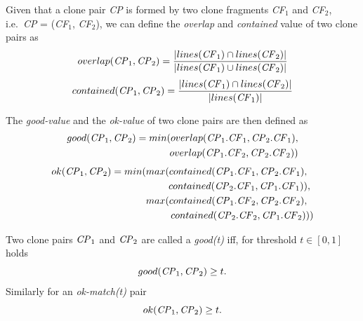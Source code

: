 \documentclass[sigconf,review, anonymous]{acmart}
\newcommand{\squeezeup}{\vspace{-0.5mm}}
\begin{document}
Given that a clone pair \textit{CP} is formed by two clone fragments
\textit{CF$_1$} and \textit{CF$_2$}, i.e.~\textit{CP} = (\textit{CF$_1$},
\textit{CF$_2$}), we can define the \textit{overlap} and
\textit{contained} value of two clone pairs as
\begin{displaymath}
  overlap(\textrm{\textit{CP}}_1, \textrm{\textit{CP}}_2) = \frac{|lines(\textrm{\textit{CF}}_1) \cap lines(\textrm{\textit{CF}}_2)|}{|lines(\textrm{\textit{CF}}_1) \cup lines(\textrm{\textit{CF}}_2)|} 
\end{displaymath}
\begin{displaymath}
  contained(\textrm{\textit{CP}}_1, \textrm{\textit{CP}}_2) = \frac{|lines(\textrm{\textit{CF}}_1) \cap lines(\textrm{\textit{CF}}_2)|}{|lines(\textrm{\textit{CF}}_1)|}
\end{displaymath}
      
\noindent%
The \textit{good-value}  and the \textit{ok-value}  of two clone pairs are then defined as
\begin{align*}
	good(\textrm{\textit{CP}}_1, \textrm{\textit{CP}}_2) = min(overlap(\textrm{\textit{CP}}_1.\textrm{\textit{CF}}_1,\textrm{\textit{CP}}_2.\textrm{\textit{CF}}_1), \\ overlap(\textrm{\textit{CP}}_1.\textrm{\textit{CF}}_2,\textrm{\textit{CP}}_2.\textrm{\textit{CF}}_2))
\end{align*}
\begin{align*}
	ok(\textrm{\textit{CP}}_1,\textrm{\textit{CP}}_2) = min(max(contained(\textrm{\textit{CP}}_1.\textrm{\textit{CF}}_1,\textrm{\textit{CP}}_2.\textrm{\textit{CF}}_1),~~ \\ contained(\textrm{\textit{CP}}_2.\textrm{\textit{CF}}_1,\textrm{\textit{CP}}_1.\textrm{\textit{CF}}_1)),~
	\\ max(contained(\textrm{\textit{CP}}_1.\textrm{\textit{CF}}_2,\textrm{\textit{CP}}_2.\textrm{\textit{CF}}_2),~~ \\contained(\textrm{\textit{CP}}_2.\textrm{\textit{CF}}_2,\textrm{\textit{CP}}_1.\textrm{\textit{CF}}_2)))
\end{align*}

\noindent%
Two clone pairs $\textrm{\textit{CP}}_1$ and $\textrm{\textit{CP}}_2$ are called a \textit{\textit{good}(t)} iff, for threshold $t \in [0,1]$ holds 
\begin{equation}
good(\textrm{\textit{CP}}_1,\textrm{\textit{CP}}_2) \geq t.
\end{equation}
%
Similarly for an \textit{ok-match(t)} pair
\begin{equation}
ok(\textrm{\textit{CP}}_1,\textrm{\textit{CP}}_2) \geq t.
\end{equation}
\end{document}
